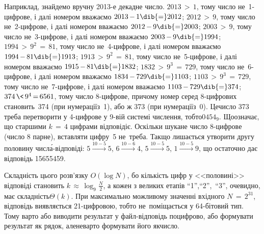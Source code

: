 Наприклад, знайдемо вручну \mbox{2013-е} декадне число. 
${2013\,{>}\,1}$, тому число не~1-цифрове, і далі номером вважаємо ${2013\,{-}\,1}\dib{{=}}2012$;\hspace{0.5em plus 0.1em} 
${2012\,{>}\,9}$, тому число не~2-цифрове, і далі номером вважаємо ${2012\,{-}\,9}\dib{{=}}2003$;\hspace{0.5em plus 0.1em}  
${2003\,{>}\,9}$, тому число не~3-цифрове, і далі номером вважаємо ${2003\,{-}\,9}\dib{{=}}1994$;\hspace{0.5em plus 0.1em} 
${1994\,{>}\,9^2\,{=}\,81}$, тому число не~4-цифрове, і далі номером вважаємо ${1994\,{-}\,81}\dib{{=}}1913$;\hspace{0.5em plus 0.1em} 
${1913\,{>}\,9^2\,{=}\,81}$, тому число не~5-цифрове, і далі номером вважаємо ${1915\,{-}\,81}\dib{{=}}1832$;\hspace{0.5em plus 0.1em} 
${1832\,{>}\,9^3\,{=}\,729}$, тому число не~6-цифрове, і далі номером вважаємо ${1834\,{-}\,729}\dib{{=}}1103$;\hspace{0.5em plus 0.1em} 
${1103\,{>}\,9^3\,{=}\,729}$, тому число не~7-цифрове, і далі номером вважаємо ${1103\,{-}\,729}\dib{{=}}374$;\hspace{0.5em plus 0.1em} 
${374\,{\<}\,9^4\,{=}\,6561}$, тому число 8-цифрове, причому номер серед 8-цифрових становить~374 (при нумерації\nolinebreak[2] з~1), або ж 373 (при нумерації\nolinebreak[2] з~0).
Це\nolinebreak[3] число 373 треба перетворити у 4-цифрове у 9-вій системі числення, тобто\nolinebreak[2] ${0454_{9}}$.
Що\nolinebreak[3] означає, що старшими ${k\,{=}\,4}$ цифрами відповіді\nolinebreak[2] є.
Оскільки шукане число 8-цифрове (число 8 парне), вставляти цифру~5 не~треба. Так\nolinebreak[2] що лишається утворити другу половину числ\'{а}-відповіді: 
$5{\xrightarrow{10-5}}5$,
$6{\xrightarrow{10-6}}4$,
$5{\xrightarrow{10-5}}5$,
$1{\xrightarrow{10-5}}9$,
що остаточно дає відповідь 15655459.

Складність цього розв'язку $O(\log N)$, бо кількість цифр у <<половині>> відповіді становить ${k\,{\approx}\,\log_9{\frac{N}{2}}}$, а кожен з великих етапів ``1'',\nolinebreak[3] ``2'',~``3'', очевидно, має складність\nolinebreak[3] $\Theta(k)$.
При максимально можливому значенні вхідного ${N\,{=}\,2^{31}}$, відповідь виявляється 21-цифровою, тобто не~поміщається у 64-бітовий тип. Тому варто або виводити результат у файл-відповідь поцифрово, або формувати результат як рядок, але\nolinebreak[3] не\nolinebreak[3] варто формувати його як\nolinebreak[2] число.